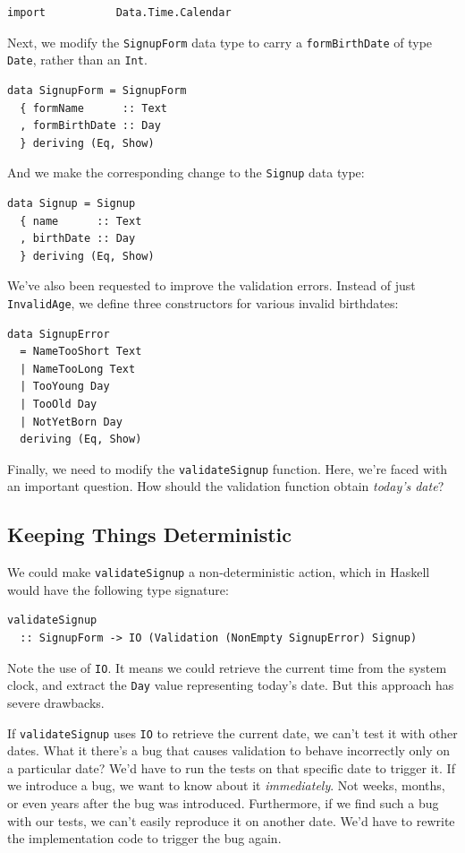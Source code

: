 \begin{verbatim}
import           Data.Time.Calendar
\end{verbatim}
Next, we modify the \texttt{SignupForm} data type to carry a
\texttt{formBirthDate} of type \texttt{Date}, rather than an
\texttt{Int}.

\begin{verbatim}
data SignupForm = SignupForm
  { formName      :: Text
  , formBirthDate :: Day
  } deriving (Eq, Show)
\end{verbatim}
And we make the corresponding change to the \texttt{Signup} data type:

\begin{verbatim}
data Signup = Signup
  { name      :: Text
  , birthDate :: Day
  } deriving (Eq, Show)
\end{verbatim}
We've also been requested to improve the validation errors. Instead of
just \texttt{InvalidAge}, we define three constructors for various
invalid birthdates:

\begin{verbatim}
data SignupError
  = NameTooShort Text
  | NameTooLong Text
  | TooYoung Day
  | TooOld Day
  | NotYetBorn Day
  deriving (Eq, Show)
\end{verbatim}
Finally, we need to modify the \texttt{validateSignup} function. Here,
we're faced with an important question. How should the validation
function obtain \emph{today's date}?

\subsection{Keeping Things
Deterministic}
\label{keeping-things-deterministic}

We could make \texttt{validateSignup} a non-deterministic action, which
in Haskell would have the following type signature:

\begin{verbatim}
validateSignup
  :: SignupForm -> IO (Validation (NonEmpty SignupError) Signup)
\end{verbatim}
Note the use of \texttt{IO}. It means we could retrieve the current time
from the system clock, and extract the \texttt{Day} value representing
today's date. But this approach has severe drawbacks.

If \texttt{validateSignup} uses \texttt{IO} to retrieve the current
date, we can't test it with other dates. What it there's a bug that
causes validation to behave incorrectly only on a particular date? We'd
have to run the tests on that specific date to trigger it. If we
introduce a bug, we want to know about it \emph{immediately}. Not weeks,
months, or even years after the bug was introduced. Furthermore, if we
find such a bug with our tests, we can't easily reproduce it on another
date. We'd have to rewrite the implementation code to trigger the bug
again.

